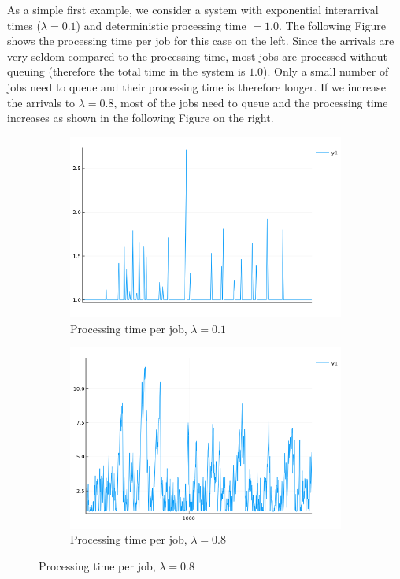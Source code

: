 As a simple first example, we consider a system with exponential interarrival times ($\lambda = 0.1$) and deterministic processing time $=1.0$. The following Figure shows the processing time per job for this case on the left. Since the arrivals are very seldom compared to the processing time, most jobs are processed without queuing (therefore the total time in the system is $1.0$). Only a small number of jobs need to queue and their processing time is therefore longer. If we increase the arrivals to $\lambda=0.8$, most of the jobs need to queue and the processing time increases as shown in the following Figure on the right.


\begin{figure}[hbt!]
\centering
\begin{subfigure}{.5\textwidth}
  \centering
  \includegraphics[width=.9\linewidth]{images/queuing_3_3.png}
  \caption{Processing time per job, $\lambda=0.1$}
  \label{fig:sub1}
\end{subfigure}%
\begin{subfigure}{.5\textwidth}
  \centering
  \includegraphics[width=.9\linewidth]{images/queuing_3_4.png}
  \caption{Processing time per job, $\lambda=0.8$}
  \label{fig:sub2}
\end{subfigure}
\end{figure}


